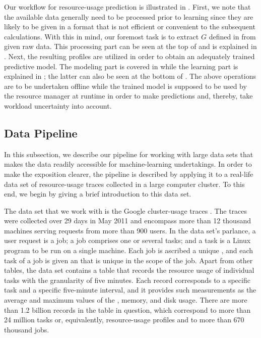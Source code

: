 Our workflow for resource-usage prediction is illustrated in
. First, we note that the available data generally need to
be processed prior to learning since they are likely to be given in a format
that is not efficient or convenient to the subsequent calculations. With this in
mind, our foremost task is to extract $G$ defined in  from
given raw data. This processing part can be seen at the top of
 and is explained in . Next, the resulting
profiles are utilized in order to obtain an adequately trained predictive model.
The modeling part is covered in  while the learning part is
explained in ; the latter can also be seen at the bottom of
. The above operations are to be undertaken offline while
the trained model is supposed to be used by the resource manager at runtime in
order to make predictions and, thereby, take workload uncertainty into account.

\subsection{Data Pipeline}

In this subsection, we describe our pipeline for working with large data sets
that makes the data readily accessible for machine-learning undertakings. In
order to make the exposition clearer, the pipeline is described by applying it
to a real-life data set of resource-usage traces collected in a large computer
cluster. To this end, we begin by giving a brief introduction to this data set.

The data set that we work with is the Google cluster-usage traces
\cite{reiss2011}. The traces were collected over 29 days in May 2011 and
encompass more than 12 thousand machines serving requests from more than 900
users. In the data set's parlance, a user request is a job; a job comprises one
or several tasks; and a task is a Linux program to be run on a single machine.
Each job is ascribed a unique , and each task of a job is given an
 that is unique in the scope of the job. Apart from other tables, the
data set contains a table that records the resource usage of individual tasks
with the granularity of five minutes. Each record corresponds to a specific task
and a specific five-minute interval, and it provides such measurements as the
average and maximum values of the , memory, and disk usage. There are
more than 1.2 billion records in the table in question, which correspond to more
than 24 million tasks or, equivalently, resource-usage profiles and to more than
670 thousand jobs.

